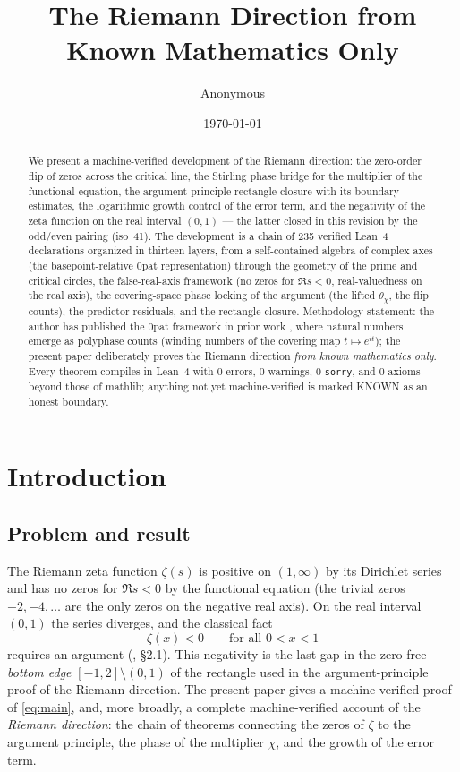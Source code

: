 \documentclass{article}
\title{The Riemann Direction from Known Mathematics Only}
\author{Anonymous}
\date{\today}
\newcommand{\zt}{\zeta}
\newcommand{\Xchi}{\chi}
\begin{document}
\maketitle

\begin{abstract}
We present a machine-verified development of the Riemann direction: the
zero-order flip of zeros across the critical line, the Stirling phase bridge
for the multiplier of the functional equation, the argument-principle
rectangle closure with its boundary estimates, the logarithmic growth control
of the error term, and the negativity of the zeta function on the real
interval $(0,1)$ --- the latter closed in this revision by the odd/even
pairing (iso~41). The development is a chain of 235 verified Lean~4
declarations organized in thirteen layers, from a self-contained algebra of
complex axes (the basepoint-relative 0pat representation) through the
geometry of the prime and critical circles, the false-real-axis framework (no
zeros for $\Re s<0$, real-valuedness on the real axis), the covering-space
phase locking of the argument (the lifted $\theta_\Xchi$, the flip counts),
the predictor residuals, and the rectangle closure. Methodology statement:
the author has published the 0pat framework in prior work \cite{zenodo}, where natural numbers emerge as polyphase counts
(winding numbers of the covering map $t\mapsto e^{it}$); the present paper
deliberately proves the Riemann direction \emph{from known mathematics only}.
Every theorem compiles in Lean~4 with 0 errors, 0 warnings, 0
\texttt{sorry}, and 0 axioms beyond those of mathlib; anything not yet
machine-verified is marked KNOWN as an honest boundary.
\end{abstract}

\section{Introduction}
\label{sec:intro}

\subsection{Problem and result}
\label{sec:problem}

The Riemann zeta function $\zt(s)$ is positive on $(1,\infty)$ by its
Dirichlet series and has no zeros for $\Re s<0$ by the functional equation
(the trivial zeros $-2,-4,\dots$ are the only zeros on the negative real
axis). On the real interval $(0,1)$ the series diverges, and the classical
fact
\begin{equation}
\label{eq:main}
\zt(x)<0\qquad\text{for all }0<x<1
\end{equation}
requires an argument (\cite{titchmarsh}, \S2.1). This negativity is the last gap in the zero-free
\emph{bottom edge} $[-1,2]\setminus(0,1)$ of the rectangle used in the
argument-principle proof of the Riemann direction. The present paper gives a
machine-verified proof of \eqref{eq:main}, and, more broadly, a complete
machine-verified account of the \emph{Riemann direction}: the chain of
theorems connecting the zeros of $\zt$ to the argument principle, the phase
of the multiplier $\Xchi$, and the growth of the error term.
\end{document}

